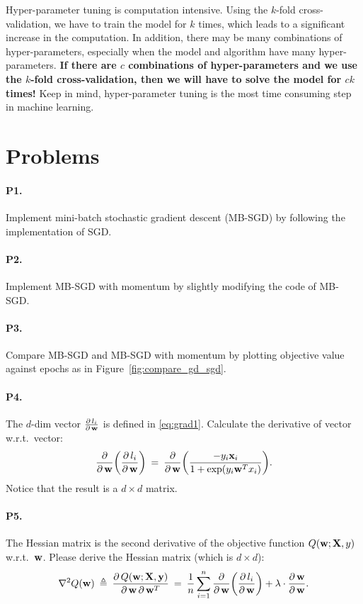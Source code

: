 \documentclass[11pt]{article}
\numberwithin{equation}{section}
\def\w{{\bf w}}
\def\X{{\bf X}}
\def\x{{\bf x}}
\def\y{{\bf y}}
\begin{document}
Hyper-parameter tuning is computation intensive.
Using the $k$-fold cross-validation, we have to train the model for $k$ times, which leads to a significant increase in the computation.
In addition, there may be many combinations of hyper-parameters, especially when the model and algorithm have many hyper-parameters.
\textbf{If there are $c$ combinations of hyper-parameters and we use the $k$-fold cross-validation,
then we will have to solve the model for $ck$ times!}
Keep in mind, hyper-parameter tuning is the most time consuming step in machine learning.


\section{Problems}

\paragraph{P1.}
Implement mini-batch stochastic gradient descent (MB-SGD) by following the implementation of SGD.


\paragraph{P2.}
Implement MB-SGD with momentum by slightly modifying the code of MB-SGD.


\paragraph{P3.}
Compare MB-SGD and MB-SGD with momentum by plotting objective value against epochs as in Figure~\ref{fig:compare_gd_sgd}.

\paragraph{P4.}
The $d$-dim vector $\frac{ \partial \, l_i }{\partial \, \w }$ is defined in \eqref{eq:grad1}.
Calculate the derivative of vector w.r.t.\ vector:
\begin{equation*}
\frac{ \partial  }{\partial \, \w } \bigg( \frac{ \partial \, l_i }{\partial \, \w } \bigg)
\: = \: \frac{ \partial  }{\partial \, \w }  \bigg( \frac{ - y_i \x_i }{1+\exp({y_i \w^T x_i})} \bigg) .
\end{equation*}
Notice that the result is a $d\times d$ matrix.

\paragraph{P5.}
The Hessian matrix is the second derivative of the objective function $Q (\w; \X, y)$ w.r.t.\ $\w$.
Please derive the Hessian matrix (which is $d\times d$):
\begin{equation*}
\nabla^2 Q (\w) 
\: \triangleq \: 
\frac{ \partial \, Q (\w; \X, \y) }{ \partial \, \w \, \partial \, \w^T }
\: = \:
\frac{1}{n} \sum_{i=1}^n 
\frac{ \partial  }{ \partial \, \w} \bigg(\frac{ \partial \, l_i }{ \partial \, \w} \bigg)
+ {\lambda} \cdot
\frac{ \partial \, \w }{ \partial \, \w} .
\end{equation*}
\end{document}
